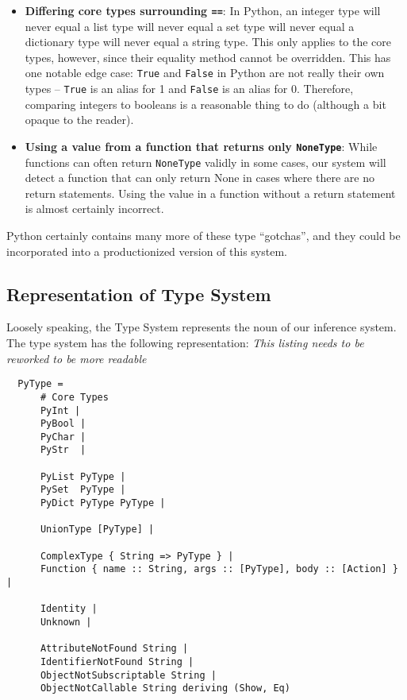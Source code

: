 \documentclass{article}[12pt]
\begin{document}
\begin{itemize}
    \item \textbf{Differing core types surrounding \texttt{==}}: In Python, an integer type will never
          equal a list type will never equal a set type will never equal a dictionary type will
          never equal a string type. This only applies to the core types, however, since their
          equality method cannot be overridden. This has one notable edge case: \texttt{True} and
          \texttt{False} in
          Python are not really their own types -- \texttt{True} is an alias for 1 and
          \texttt{False} is an alias for 0. Therefore, comparing integers to booleans is a
          reasonable thing to do (although a bit opaque to the reader).

      \item \textbf{Using a value from a function that returns only \texttt{NoneType}}: While functions can often
          return \texttt{NoneType} validly in some cases, our system will detect a function that can only
          return None in cases where there are no return statements. Using the value in a function
          without a return statement is almost certainly incorrect.
\end{itemize}

Python certainly contains many more of these type ``gotchas'', and they could be incorporated into a
productionized version of this system.
          

\subsection{Representation of Type System} 

Loosely speaking, the Type System represents the noun of our inference system. The type system has
the following representation:
\emph{This listing needs to be reworked to be more readable}
 \begin{verbatim} 
  PyType = 
      # Core Types
      PyInt | 
      PyBool | 
      PyChar |
      PyStr  |

      PyList PyType | 
      PySet  PyType |
      PyDict PyType PyType | 

      UnionType [PyType] | 

      ComplexType { String => PyType } | 
      Function { name :: String, args :: [PyType], body :: [Action] } | 

      Identity |
      Unknown |

      AttributeNotFound String |
      IdentifierNotFound String |
      ObjectNotSubscriptable String |
      ObjectNotCallable String deriving (Show, Eq) 
\end{verbatim}
\end{document}
